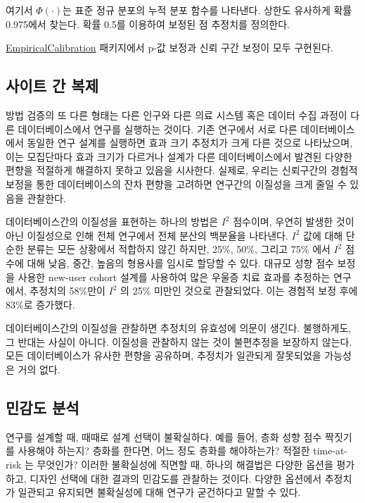 \documentclass[11pt]{book}
\theoremstyle{definition}
\theoremstyle{definition}
\theoremstyle{definition}
\theoremstyle{remark}
\let\BeginKnitrBlock\begin \let\EndKnitrBlock\end
\begin{document}
여기서 \(\Phi(\cdot)\)는 표준 정규 분포의 누적 분포 함수를 나타낸다.
상한도 유사하게 확률 0.975에서 찾는다. 확률 0.5를 이용하여 보정된 점
추정치를 정의한다.

\href{https://ohdsi.github.io/EmpiricalCalibration/}{EmpiricalCalibration}
패키지에서 p-값 보정과 신뢰 구간 보정이 모두 구현된다.

\subsection{사이트 간 복제}\label{--}


방법 검증의 또 다른 형태는 다른 인구와 다른 의료 시스템 혹은 데이터 수집
과정이 다른 데이터베이스에서 연구를 실행하는 것이다. 기존 연구에서 서로
다른 데이터베이스에서 동일한 연구 설계를 실행하면 효과 크기 추정치가
크게 다른 것으로 나타났으며, \citep{madigan_2013} 이는 모집단마다 효과
크기가 다르거나 설계가 다른 데이터베이스에서 발견된 다양한 편향을
적절하게 해결하지 못하고 있음을 시사한다. 실제로, 우리는 신뢰구간의
경험적 보정을 통한 데이터베이스의 잔차 편향을 고려하면 연구간의 이질성을
크게 줄일 수 있음을 관찰한다. \citep{schuemie_2018}

데이터베이스간의 이질성을 표현하는 하나의 방법은 \(I^2\) 점수이며,
우연히 발생한 것이 아닌 이질성으로 인해 전체 연구에서 전체 분산의
백분율을 나타낸다. \citep{higgins_2003} \(I^2\) 값에 대해 단순한 분류는
모든 상황에서 적합하지 않긴 하지만, 25\%, 50\%, 그리고 75\% 에서 \(I^2\)
점수에 대해 낮음, 중간, 높음의 형용사를 임시로 할당할 수 있다. 대규모
성향 점수 보정을 사용한 new-user cohort 설계를 사용하여 많은 우울증 치료
효과를 추정하는 연구에서, \citep{schuemie_2018b} 추정치의 58\%만이
\(I^2\) 의 25\% 미만인 것으로 관찰되었다. 이는 경험적 보정 후에 83\%로
증가했다.

\BeginKnitrBlock{rmdimportant}
데이터베이스간의 이질성을 관찰하면 추정치의 유효성에 의문이 생긴다.
불행하게도, 그 반대는 사실이 아니다. 이질성을 관찰하지 않는 것이
불편추정을 보장하지 않는다. 모든 데이터베이스가 유사한 편향을 공유하며,
추정치가 일관되게 잘못되었을 가능성은 거의 없다.
\EndKnitrBlock{rmdimportant}

\subsection{민감도 분석}\label{-}


연구를 설계할 때, 때때로 설계 선택이 불확실하다. 예를 들어, 층화 성향
점수 짝짓기를 사용해야 하는지? 층화를 한다면, 어느 정도 층화를
해야하는가? 적절한 time-at-risk 는 무엇인가? 이러한 불확실성에 직면할
때, 하나의 해결법은 다양한 옵션을 평가하고, 디자인 선택에 대한 결과의
민감도를 관찰하는 것이다. 다양한 옵션에서 추정치가 일관되고 유지되면
불확실성에 대해 연구가 굳건하다고 말할 수 있다.
\end{document}
